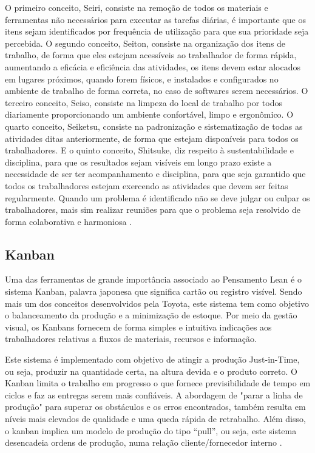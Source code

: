 \begin{anexosenv}
O primeiro conceito, Seiri, consiste na  remoção de todos os materiais e ferramentas não necessários para executar as tarefas diárias, é importante que os itens sejam identificados por frequência de utilização para que sua prioridade seja percebida.  O segundo conceito, Seiton, consiste na organização dos itens de trabalho, de forma que eles estejam acessíveis ao trabalhador de forma rápida, aumentando a eficácia e eficiência das atividades, os itens devem estar alocados em lugares próximos, quando forem físicos, e instalados e configurados no ambiente de trabalho de forma correta, no caso de softwares serem necessários. O terceiro conceito, Seiso, consiste na limpeza do local de trabalho por todos diariamente proporcionando um ambiente confortável, limpo e ergonômico. O quarto conceito, Seiketsu, consiste na padronização e sistematização de todas as atividades ditas anteriormente, de forma que estejam disponíveis para todos os trabalhadores. E o quinto conceito, Shitsuke, diz respeito à sustentabilidade e disciplina, para que os resultados sejam visíveis em longo prazo existe a necessidade de ser ter acompanhamento e disciplina, para que seja garantido que todos os trabalhadores estejam exercendo as atividades que devem ser feitas regularmente. Quando um problema é identificado não se deve julgar ou culpar os trabalhadores, mais sim realizar reuniões para que o problema seja resolvido de forma colaborativa e harmoniosa  \cite{bell2011}. 

\subsection[Kanban]{Kanban}

Uma das ferramentas de grande importância associado ao Pensamento Lean é o sistema Kanban, palavra japonesa que significa cartão ou registro visível. Sendo mais um dos conceitos desenvolvidos pela Toyota, este sistema tem como objetivo o balanceamento da produção e a minimização de estoque. Por meio da gestão visual, os Kanbans fornecem de forma simples e intuitiva indicações aos trabalhadores relativas a fluxos de materiais, recursos e informação. 

Este sistema é implementado com objetivo de atingir a produção Just-in-Time, ou seja, produzir na quantidade certa, na altura devida e o produto correto. O Kanban limita o trabalho em progresso o que fornece previsibilidade de tempo em ciclos e faz as entregas serem mais confiáveis. A abordagem de "parar a linha de produção" para superar os obstáculos e os erros encontrados, também resulta em níveis mais elevados de qualidade e uma queda rápida de retrabalho. Além disso, o kanban implica um modelo de produção do tipo “pull”, ou seja, este sistema desencadeia ordens de produção, numa relação cliente/fornecedor interno \cite{rodrigues2012}.  


\end{anexosenv}
